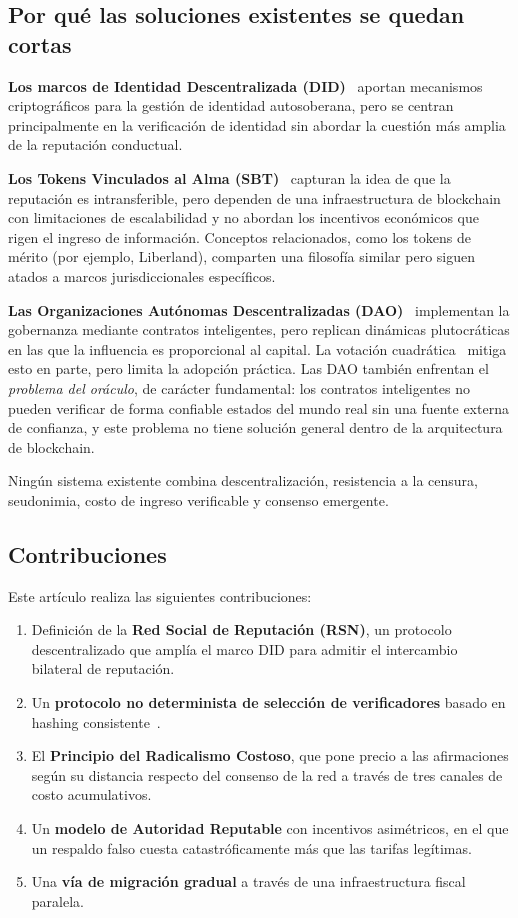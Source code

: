 \documentclass[11pt,a4paper,twocolumn]{article}
\begin{document}
\subsection{Por qué las soluciones existentes se quedan cortas}

\textbf{Los marcos de Identidad Descentralizada (DID)}~\cite{did2022} aportan mecanismos criptográficos para la gestión de identidad autosoberana, pero se centran principalmente en la verificación de identidad sin abordar la cuestión más amplia de la reputación conductual.

\textbf{Los Tokens Vinculados al Alma (SBT)}~\cite{weyl2022} capturan la idea de que la reputación es intransferible, pero dependen de una infraestructura de blockchain con limitaciones de escalabilidad y no abordan los incentivos económicos que rigen el ingreso de información. Conceptos relacionados, como los tokens de mérito (por ejemplo, Liberland), comparten una filosofía similar pero siguen atados a marcos jurisdiccionales específicos.

\textbf{Las Organizaciones Autónomas Descentralizadas (DAO)}~\cite{buterin2014} implementan la gobernanza mediante contratos inteligentes, pero replican dinámicas plutocráticas en las que la influencia es proporcional al capital. La votación cuadrática~\cite{buterin2019} mitiga esto en parte, pero limita la adopción práctica. Las DAO también enfrentan el \emph{problema del oráculo}, de carácter fundamental: los contratos inteligentes no pueden verificar de forma confiable estados del mundo real sin una fuente externa de confianza, y este problema no tiene solución general dentro de la arquitectura de blockchain.

Ningún sistema existente combina descentralización, resistencia a la censura, seudonimia, costo de ingreso verificable y consenso emergente.

\subsection{Contribuciones}

Este artículo realiza las siguientes contribuciones:
\begin{enumerate}[nosep]
\item Definición de la \textbf{Red Social de Reputación (RSN)}, un protocolo descentralizado que amplía el marco DID para admitir el intercambio bilateral de reputación.
\item Un \textbf{protocolo no determinista de selección de verificadores} basado en hashing consistente~\cite{karger1997}.
\item El \textbf{Principio del Radicalismo Costoso}, que pone precio a las afirmaciones según su distancia respecto del consenso de la red a través de tres canales de costo acumulativos.
\item Un \textbf{modelo de Autoridad Reputable} con incentivos asimétricos, en el que un respaldo falso cuesta catastróficamente más que las tarifas legítimas.
\item Una \textbf{vía de migración gradual} a través de una infraestructura fiscal paralela.
\end{enumerate}
\end{document}

